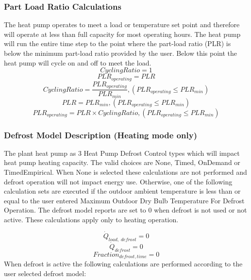 \subsubsection{Part Load Ratio Calculations}\label{eir-air-to-water-heat-pumps-part-load-ratio-calculations}
The heat pump operates to meet a load or temperature set point and therefore will operate at less than full capacity for most operating hours. The heat pump will run the entire time step to the point where the part-load ratio (PLR) is below the minimum part-load ratio provided by the user. Below this point the heat pump will cycle on and off to meet the load.
\begin{equation}
CyclingRatio = 1
\end{equation}
\begin{equation}
PLR_{operating} = PLR
\end{equation}
\begin{equation}
CyclingRatio = \frac{PLR_{operating}}{PLR_{min}}, {(PLR_{operating}\le PLR_{min})}
\end{equation}
\begin{equation}
PLR = PLR_{min}, {(PLR_{operating}\le PLR_{min})}
\end{equation}
\begin{equation}
PLR_{operating} = PLR \times CyclingRatio, {(PLR_{operating}\le PLR_{min})}
\end{equation}


\subsubsection{Defrost Model Description (Heating mode only)}\label{eir-air-to-water-heat-pumps-defrost-model-description}
The plant heat pump as 3 Heat Pump Defrost Control types which will impact heat pump heating capacity. The valid choices are None, Timed, OnDemand or TimedEmpirical. When None is selected these calculations are not performed and defrost operation will not impact energy use. Otherwise, one of the following calculation sets are executed if the outdoor ambient temperature is less than or equal to the user entered Maximum Outdoor Dry Bulb Temperature For Defrost Operation. The defrost model reports are set to 0 when defrost is not used or not active. These calculations apply only to heating operation.

\begin{equation}
\dot{Q}_{load,\; defrost} = {0}
\end{equation}
\begin{equation}
\dot{Q}_{defrost} = {0}
\end{equation}
\begin{equation}
Fraction_{defrost, time} = {0}
\end{equation}
When defrost is active the following calculations are performed according to the user selected defrost model:

